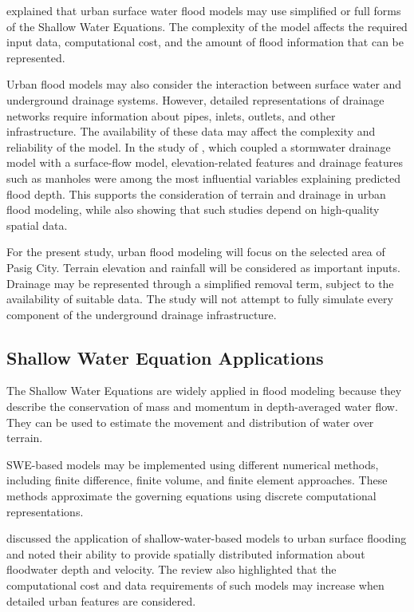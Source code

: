  explained that urban surface water flood models may use simplified or full forms of the Shallow Water Equations. The complexity of the model affects the required input data, computational cost, and the amount of flood information that can be represented.

Urban flood models may also consider the interaction between surface water and underground drainage systems. However, detailed representations of drainage networks require information about pipes, inlets, outlets, and other infrastructure. The availability of these data may affect the complexity and reliability of the model. In the study of , which coupled a stormwater drainage model with a surface-flow model, elevation-related features and drainage features such as manholes were among the most influential variables explaining predicted flood depth. This supports the consideration of terrain and drainage in urban flood modeling, while also showing that such studies depend on high-quality spatial data.

For the present study, urban flood modeling will focus on the selected area of Pasig City. Terrain elevation and rainfall will be considered as important inputs. Drainage may be represented through a simplified removal term, subject to the availability of suitable data. The study will not attempt to fully simulate every component of the underground drainage infrastructure.

\subsection{Shallow Water Equation Applications}

The Shallow Water Equations are widely applied in flood modeling because they describe the conservation of mass and momentum in depth-averaged water flow. They can be used to estimate the movement and distribution of water over terrain.

SWE-based models may be implemented using different numerical methods, including finite difference, finite volume, and finite element approaches. These methods approximate the governing equations using discrete computational representations.

 discussed the application of shallow-water-based models to urban surface flooding and noted their ability to provide spatially distributed information about floodwater depth and velocity. The review also highlighted that the computational cost and data requirements of such models may increase when detailed urban features are considered.

